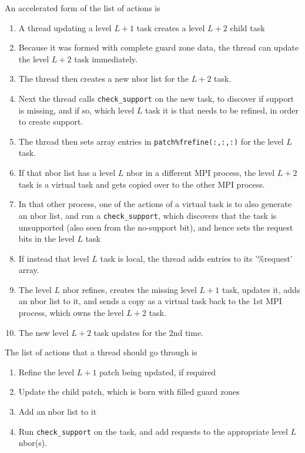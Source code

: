 \documentclass[paper=a4,fontsize=11pt]{scrartcl}
\numberwithin{equation}{section}		%
\numberwithin{figure}{section}			%
\numberwithin{table}{section}				%
\newcommand{\codecolor}{\color{Blue}}
\newcommand{\Code}[1]{{\codecolor\texttt{#1}}}
\begin{document}
An accelerated form of the list of actions is
\begin{enumerate}
    \item A thread updating a level $L+1$ task creates a level $L+2$ child task
    \item Because it was formed with complete guard zone data, the thread can update the level $L+2$ task immediately.
    \item The thread then creates a new nbor list for the $L+2$ task.   
    \item Next the thread calls \Code{check\_support} on the new task, to discover if support is missing, and if so, which level $L$ task it is that needs to be refined, in order to create support.
    \item The thread then sets array entries in \Code{patch\%frefine(:,:,:)} for the level $L$ task.
    \item If that nbor list has a level $L$ nbor in a different MPI process, the level $L+2$ task is a virtual task and gets copied over to the other MPI process.
    \item In that other process, one of the actions of a virtual task is to also generate an nbor list, and run a \Code{check\_support}, which discovers that the task is unsupported (also seen from the no-support bit), and hence sets the request bits in the level $L$ task
    \item If instead that level $L$ task is local, the thread adds entries to its '\%request' array.
    \item The level $L$ nbor refines, creates the missing level $L+1$ task, updates it, adds an nbor list to it, and sends a copy as a virtual task back to the 1st MPI process, which owns the level $L+2$ task.
    \item The new level $L+2$ task updates for the 2nd time.
\end{enumerate}

The list of actions that a thread should go through is
\begin{enumerate}
    \item Refine the level $L+1$ patch being updated, if required
    \item Update the child patch, which is born with filled guard zones
    \item Add an nbor list to it
    \item Run \Code{check\_support} on the task, and add requests to the appropriate level $L$ nbor(s).
\end{enumerate}
\end{document}
